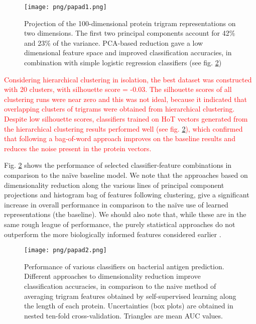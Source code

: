 \documentclass[10pt,journal,compsoc,twoside]{IEEEtran}
\begin{document}
\begin{figure}[!t]
\centering
\texttt{[image: png/papad1.png]}
\caption{Projection of the 100-dimensional protein trigram representations on two dimensions. The first two principal components account for 42\% and 23\% of the variance. PCA-based reduction gave a low dimensional feature space and improved classification accuracies, in combination with simple logistic regression classifiers (see fig. \ref{fig:fig-model-selection})}
\label{fig:fig-pca}
\end{figure}

\textcolor{red}{Considering hierarchical clustering in isolation, the best dataset was constructed with 20 clusters, with silhouette score = -0.03. The silhouette scores of all clustering runs were near zero and this was not ideal, because it indicated that overlapping clusters of trigrams were obtained from hierarchical clustering. Despite low silhouette scores, classifiers trained on HoT vectors generated from the hierarchical clustering results performed well (see fig. \ref{fig:fig-model-selection}), which confirmed that following a bag-of-word approach improves on the baseline results and reduces the noise present in the protein vectors.}

Fig. \ref{fig:fig-model-selection} shows the performance of selected classifier-feature combinations in comparison to the naïve baseline model. We note that the approaches based on dimensionality reduction along the various lines of principal component projections and histogram bag of features following clustering, give a significant increase in overall performance in comparison to the naïve use of learned representations (the baseline). We should also note that, while these are in the same rough league of performance, the purely statistical approaches do not outperform the more biologically informed features considered earlier \cite{heinson_2019}.

\begin{figure}[!t]
\centering
\texttt{[image: png/papad2.png]}
\caption{Performance of various classifiers on bacterial antigen prediction. Different approaches to dimensionality reduction improve classification accuracies, in comparison to the naive method of averaging trigram features obtained by self-supervised learning along the length of each protein. Uncertainties (box plots) are obtained in nested ten-fold cross-validation. Triangles are mean AUC values.}
\label{fig:fig-model-selection}
\end{figure}
\end{document}
